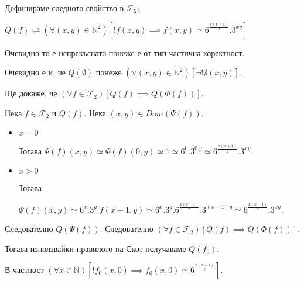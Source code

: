\documentclass{article}
\begin{document}
Дефинираме следното свойство в \(\mathcal{F}_2\):

\(Q(f) \rightleftharpoons (\forall (x, y) \in \mathbb{N}^2)[!f(x, y) \implies f(x, y) \simeq 6^{\displaystyle\frac{x(x + 1)}{2}}.3^{xy}]\)

Очевидно то е непрекъснато понеже е от тип частична коректност.

Очевидно е и, че \(Q(\emptyset)\) понеже \((\forall (x, y) \in \mathbb{N}^2)[\lnot!\emptyset(x, y)]\).

Ще докаже, че \((\forall f \in \mathcal{F}_2)[Q(f) \implies Q(\Phi(f))]\).

Нека \(f \in \mathcal{F}_2\) и \(Q(f)\). Нека \((x, y) \in Dom(\Psi(f))\).
\begin{itemize}
\item \(x = 0\)

Тогава \(\Psi(f)(x, y) \simeq \Psi(f)(0, y) \simeq 1 \simeq 6^{0}.3^{0.y} \simeq 6^{\displaystyle\frac{x(x + 1)}{2}}.3^{xy}\).

\item \(x > 0\)

Тогава

\(\Psi(f)(x, y) \simeq 6^x.3^y.f(x - 1, y) \simeq 6^x.3^y.6^{\displaystyle\frac{x(x - 1)}{2}}.3^{(x - 1)y} \simeq 6^{\displaystyle\frac{x(x + 1)}{2}}.3^{xy}\).
\end{itemize}
Следователно \(Q(\Psi(f))\).
Следователно \((\forall f \in \mathcal{F}_2)[Q(f) \implies Q(\Phi(f))]\).

Тогава използвайки правилото на Скот получаваме \(Q(f_0)\).

В частност \((\forall x \in \mathbb{N})[!f_0(x, 0) \implies f_0(x, 0) \simeq 6^{\displaystyle\frac{x(x + 1)}{2}}]\).
\end{document}
